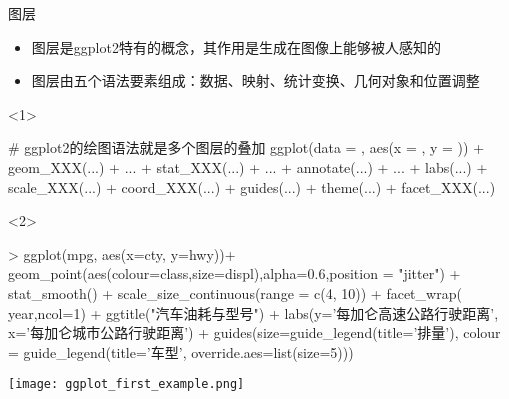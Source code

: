 \begin{frame}[t,fragile]{\subsecname}{图层}
\begin{itemize}
\item 图层是ggplot2特有的概念，其作用是生成在图像上能够被人感知的
\item 图层由五个语法要素组成：数据、映射、统计变换、几何对象和位置调整
\end{itemize}

\begin{overlayarea}{\textwidth}{\textheight}
\begin{onlyenv}<1>
\begin{rcode}
# ggplot2的绘图语法就是多个图层的叠加 
ggplot(data = , aes(x = , y = )) + geom_XXX(...) + ... + stat_XXX(...) + ... + annotate(...) + ... + labs(...) + scale_XXX(...) + coord_XXX(...) + guides(...) + theme(...) + facet_XXX(...)
\end{rcode}
\end{onlyenv}

\begin{onlyenv}<2>
\begin{minipage}{\textwidth}
\begin{rcode}
> ggplot(mpg, aes(x=cty, y=hwy))+   
  geom_point(aes(colour=class,size=displ),alpha=0.6,position = "jitter") +  
  stat_smooth() +  
  scale_size_continuous(range = c(4, 10)) +  
  facet_wrap(~ year,ncol=1) +  
  ggtitle("汽车油耗与型号") +  
  labs(y='每加仑高速公路行驶距离', x='每加仑城市公路行驶距离') +  
  guides(size=guide_legend(title='排量'), colour = guide_legend(title='车型', override.aes=list(size=5))) 
\end{rcode} 
\end{minipage}

\begin{minipage}{\textwidth}
\centering
\texttt{[image: ggplot\_first\_example.png]}
\end{minipage}
\end{onlyenv}
\end{overlayarea}
\end{frame}


